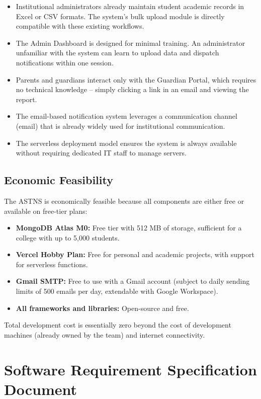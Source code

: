 \documentclass[12pt,a4paper]{report}
\begin{document}
\begin{itemize}
  \item Institutional administrators already maintain student academic records in Excel or CSV formats. The system's bulk upload module is directly compatible with these existing workflows.
  \item The Admin Dashboard is designed for minimal training. An administrator unfamiliar with the system can learn to upload data and dispatch notifications within one session.
  \item Parents and guardians interact only with the Guardian Portal, which requires no technical knowledge -- simply clicking a link in an email and viewing the report.
  \item The email-based notification system leverages a communication channel (email) that is already widely used for institutional communication.
  \item The serverless deployment model ensures the system is always available without requiring dedicated IT staff to manage servers.
\end{itemize}

\subsection{Economic Feasibility}
The ASTNS is economically feasible because all components are either free or available on free-tier plans:

\begin{itemize}
  \item \textbf{MongoDB Atlas M0:} Free tier with 512 MB of storage, sufficient for a college with up to 5,000 students.
  \item \textbf{Vercel Hobby Plan:} Free for personal and academic projects, with support for serverless functions.
  \item \textbf{Gmail SMTP:} Free to use with a Gmail account (subject to daily sending limits of 500 emails per day, extendable with Google Workspace).
  \item \textbf{All frameworks and libraries:} Open-source and free.
\end{itemize}

Total development cost is essentially zero beyond the cost of development machines (already owned by the team) and internet connectivity.
\section{Software Requirement Specification Document}
\end{document}
